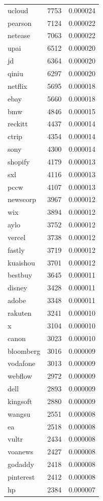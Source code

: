 \begin{tabular}{lrr}
ucloud & 7753 & 0.000024 \\
pearson & 7124 & 0.000022 \\
netease & 7063 & 0.000022 \\
upai & 6512 & 0.000020 \\
jd & 6364 & 0.000020 \\
qiniu & 6297 & 0.000020 \\
netflix & 5695 & 0.000018 \\
ebay & 5660 & 0.000018 \\
bmw & 4846 & 0.000015 \\
reckitt & 4437 & 0.000014 \\
ctrip & 4354 & 0.000014 \\
sony & 4300 & 0.000014 \\
shopify & 4179 & 0.000013 \\
sxl & 4116 & 0.000013 \\
pccw & 4107 & 0.000013 \\
newscorp & 3967 & 0.000012 \\
wix & 3894 & 0.000012 \\
aylo & 3752 & 0.000012 \\
vercel & 3738 & 0.000012 \\
fastly & 3719 & 0.000012 \\
kuaishou & 3701 & 0.000012 \\
bestbuy & 3645 & 0.000011 \\
disney & 3428 & 0.000011 \\
adobe & 3348 & 0.000011 \\
rakuten & 3241 & 0.000010 \\
x & 3104 & 0.000010 \\
canon & 3023 & 0.000010 \\
bloomberg & 3016 & 0.000009 \\
vodafone & 3013 & 0.000009 \\
webflow & 2972 & 0.000009 \\
dell & 2893 & 0.000009 \\
kingsoft & 2880 & 0.000009 \\
wangsu & 2551 & 0.000008 \\
ea & 2518 & 0.000008 \\
vultr & 2434 & 0.000008 \\
voanews & 2427 & 0.000008 \\
godaddy & 2418 & 0.000008 \\
pinterest & 2412 & 0.000008 \\
hp & 2384 & 0.000007 \\

\end{tabular}
